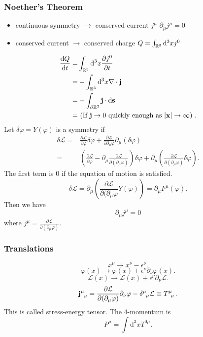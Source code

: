 \subsubsection{Noether's Theorem}
\begin{itemize}
  \item continuous symmetry $\to $ conserved current $j^\mu$ $\partial_\mu j^\mu=0$
  \item conserved current $\to $ conserved charge $Q=\int_{\mathbb{R}^3}\mathrm{d}^3xj^{0}$
\end{itemize}
\begin{align*}
  \frac{\mathrm{d}Q}{\mathrm{d}t}=&\int_{\mathbb{R}^3 }\mathrm{d}^3x \frac{\partial j^{0}}{\partial t} \\
  =& -\int_{\mathbb{R}^3}\mathrm{d}^3x\nabla \cdot \mathbf{j}\\
  =&-\int_{\partial\mathbb{R}^3}\mathbf{j}\cdot \mathrm{d}\mathbf{s}\\
  =&\text{ (If $\mathbf{j}\to 0$ quickly enough as  $\left| \mathbf{x} \right| \to \infty$) }
.\end{align*}
Let $\delta\varphi=Y(\varphi)$ is a symmetry if 
\begin{align*} 
  \delta \mathcal{L}=&\frac{\partial \mathcal{L}}{\partial \varphi} \delta\varphi+\frac{\partial \mathcal{L}}{\partial \partial_\mu\varphi} \partial_\mu(\delta\varphi)\\
  =&\left( \frac{\partial \mathcal{L}}{\partial \varphi} -\partial_\mu \frac{\partial \mathcal{L}}{\partial (\partial_\mu\varphi)} \right)\delta\varphi+\partial_\mu\left( \frac{\partial \mathcal{L}}{\partial (\partial_\mu\varphi)} \delta \varphi \right)  
.\end{align*} 
The first term is $0$ if the equation of motion is satisfied.
\[
  \delta\mathcal{L}=\partial_\mu\left(\frac{\partial \mathcal{L}}{\partial (\partial_\mu\varphi} Y\left( \varphi \right)  \right)=\partial_\mu F^{\mu}\left( \varphi \right)  
.\] 
Then we have  \[
\partial_\mu j^\mu=0
\]
where $j^\mu=\frac{\partial \mathcal{L}}{\partial \left( \partial_\mu\varphi \right) } $.
\subsubsection*{Translations}
\[
  x^{\nu}\to x^{\nu}-\epsilon^{\nu}
.\] 
\[
  \varphi(x)\to \varphi(x)+\epsilon^\nu\partial_\nu\varphi(x)
.\] 
\[
\mathcal{L}(x)\to \mathcal{L}(x)+\epsilon^\nu\partial_\nu\mathcal{L}
.\]
\[
  \tensor{\mathbf{j}}{^\mu_\nu} =\frac{\partial \mathcal{L}}{\partial (\partial_\mu\varphi)}\partial_\nu\varphi-\tensor{\delta}{^\mu_\nu} \mathcal{L}\equiv \tensor{T}{^\mu_\nu}  
.\]
This is called stress-energy tensor. The $4$-momentum is \[
P^{\mu}=\int \mathrm{d}^3xT^{0\mu}
.\]
